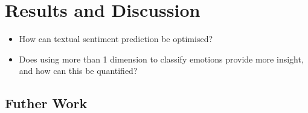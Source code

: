 

 


\section{Results and Discussion}
\begin{itemize}
    \item How can textual sentiment prediction be optimised?
    \item Does using more than 1 dimension to classify emotions provide more insight, and how can this be quantified?
\end{itemize}
\subsection{Futher Work}